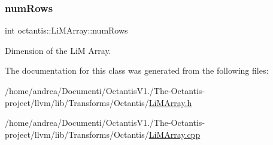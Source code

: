 \subsubsection{\texorpdfstring{num\+Rows}{numRows}}
{\footnotesize\ttfamily int octantis\+::\+Li\+M\+Array\+::num\+Rows}



Dimension of the LiM Array. 



The documentation for this class was generated from the following files\+:\begin{DoxyCompactItemize}
\item 
/home/andrea/\+Documenti/\+Octantis\+V1./\+The-\/\+Octantis-\/project/llvm/lib/\+Transforms/\+Octantis/\hyperlink{LiMArray_8h}{Li\+M\+Array.\+h}\item 
/home/andrea/\+Documenti/\+Octantis\+V1./\+The-\/\+Octantis-\/project/llvm/lib/\+Transforms/\+Octantis/\hyperlink{LiMArray_8cpp}{Li\+M\+Array.\+cpp}\end{DoxyCompactItemize}
